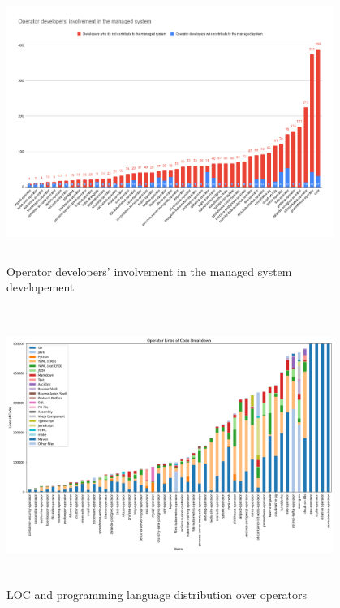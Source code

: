 \begin{figure}
  \centering
  \includegraphics[width=0.95\textwidth,height=9cm]{figures/operator-contributor-involvement-breakdown.png}
  \caption{Operator developers' involvement in the managed system developement}
  \label{fig:contributor}
\end{figure}

\begin{figure}
    \centering
    \includegraphics[width=0.95\textwidth,height=9cm]{figures/operator-loc-bar.png}
    \caption{LOC and programming language distribution over operators}
    \label{fig:loc}
\end{figure}
